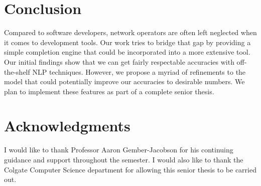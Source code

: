 \section{Conclusion}
Compared to software developers, network operators are often left neglected when it comes to development tools. Our work tries to bridge that gap by providing a simple completion engine that could be incorporated into a more extensive tool. Our initial findings show that we can get fairly respectable accuracies with off-the-shelf NLP techniques. However, we propose a myriad of refinements to the model that could potentially improve our accuracies to desirable numbers. We plan to implement these features as part of a complete senior thesis.

\section{Acknowledgments}
I would like to thank Professor Aaron Gember-Jacobson for his continuing guidance and support throughout the semester. I would also like to thank the Colgate Computer Science department for allowing this senior thesis to be carried out.